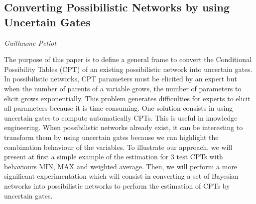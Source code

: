 \documentclass[../booklet.tex]{subfiles}
\begin{document}
\subsection[Converting Possibilistic Networks by using Uncertain Gates. {\it Guillaume Petiot}]{Converting Possibilistic Networks by using Uncertain Gates}

\begin{center}
  {\it Guillaume Petiot}
\end{center}

\vskip 0.8cm


The purpose of this paper is to define a general frame to convert the Conditional Possibility Tables (CPT) of an existing possibilistic network into uncertain gates. In possibilistic networks, CPT parameters must be elicited by an expert but when the number of parents of a variable grows, the number of parameters to elicit grows exponentially.	This problem generates difficulties for experts to elicit all parameters because it is time-consuming. One solution consists in using uncertain gates to compute automatically CPTs. This is useful in knowledge engineering. When possibilistic networks already exist, it can be interesting to transform them by using uncertain gates because we can highlight the  combination behaviour of the variables. To illustrate our approach, we will present at first a simple example of the estimation for 3 test CPTs with behaviours MIN, MAX and weighted average. Then, we will perform a more significant experimentation which will consist in converting a set of Bayesian networks into possibilistic networks to perform the estimation of CPTs by uncertain gates. 

\end{document}
